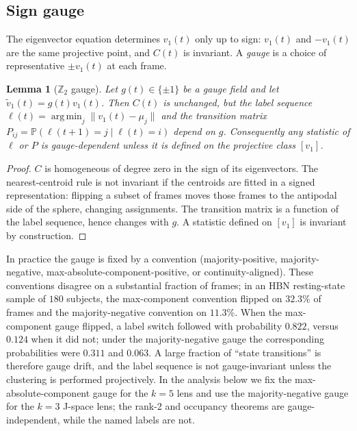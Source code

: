 \documentclass[11pt]{article}
\newtheorem{lemma}{Lemma}
\theoremstyle{definition}
\newcommand{\Prob}{\mathbb{P}}
\DeclareMathOperator*{\argmin}{arg\,min}
\begin{document}
\subsection{Sign gauge}
The eigenvector equation determines $v_1(t)$ only up to sign: $v_1(t)$ and $-v_1(t)$ are
the same projective point, and $C(t)$ is invariant. A \emph{gauge} is a choice of
representative $\pm v_1(t)$ at each frame.

\begin{lemma}[$\mathbb{Z}_2$ gauge]
\label{lem:gauge}
Let $g(t)\in\{\pm1\}$ be a gauge field and let $\tilde v_1(t)=g(t)v_1(t)$. Then $C(t)$
is unchanged, but the label sequence
$\ell(t)=\argmin_j\|v_1(t)-\mu_j\|$ and the transition matrix
$P_{ij}=\Prob(\ell(t+1)=j\mid\ell(t)=i)$ depend on $g$. Consequently any statistic of
$\ell$ or $P$ is gauge-dependent unless it is defined on the projective class $[v_1]$.
\end{lemma}

\begin{proof}
$C$ is homogeneous of degree zero in the sign of its eigenvectors. The nearest-centroid
rule is not invariant if the centroids are fitted in a signed representation: flipping a
subset of frames moves those frames to the antipodal side of the sphere, changing
assignments. The transition matrix is a function of the label sequence, hence changes
with $g$. A statistic defined on $[v_1]$ is invariant by construction.
\end{proof}

In practice the gauge is fixed by a convention (majority-positive, majority-negative,
max-absolute-component-positive, or continuity-aligned). These conventions disagree on a
substantial fraction of frames; in an HBN resting-state sample of $180$ subjects, the
max-component convention flipped on $32.3\%$ of frames and the majority-negative
convention on $11.3\%$. When the max-component gauge flipped, a label switch followed
with probability $0.822$, versus $0.124$ when it did not; under the majority-negative
gauge the corresponding probabilities were $0.311$ and $0.063$. A large fraction of
``state transitions'' is therefore gauge drift, and the label sequence is not
gauge-invariant unless the clustering is performed projectively. In the analysis below
we fix the max-absolute-component gauge for the $k=5$ lens and use the majority-negative
gauge for the $k=3$ J-space lens; the rank-2 and occupancy theorems are
gauge-independent, while the named labels are not.
\end{document}
